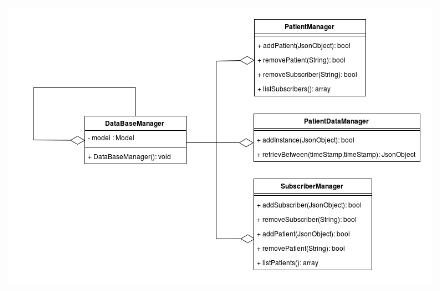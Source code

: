 \begin{center}
\begin{figure}[h]
	\includegraphics[width=15cm, height=13cm]{DataStorage/DataStorage.png}
\end{figure}
\end{center}

